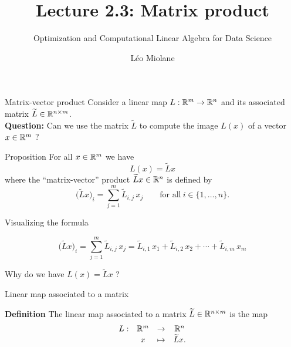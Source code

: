 \documentclass{beamer}
\title{Lecture 2.3: Matrix product}
\subtitle{Optimization and Computational Linear Algebra for Data Science}
\author{Léo Miolane}
\date{}
\begin{document}
\setcounter{showProgressBar}{0}
\setcounter{showSlideNumbers}{0}

\frame{\titlepage}


\setcounter{framenumber}{0}
\setcounter{showSlideNumbers}{1}

\begin{frame}[t]{Matrix-vector product}
	Consider a linear map $L:\mathbb{R}^m \to \mathbb{R}^n$ and its associated matrix $\widetilde{L} \in \mathbb{R}^{n \times m}$.
	\\
	\vspace{0.3cm}
	\textbf{Question:} Can we use the matrix $\widetilde{L}$ to compute the image $L(x)$ of a vector $x\in\mathbb{R}^m$ ?
	\vspace{0.3cm}

	\begin{block}{Proposition}
		For all $x\in\mathbb{R}^m$ we have
		$$
		L(x) = \widetilde{L} x
		$$
		where the ``matrix-vector'' product $\widetilde{L}x \in \mathbb{R}^n$ is defined by
		$$
		\big(\widetilde{L}x\big)_i = \sum_{j=1}^m \widetilde{L}_{i,j} \, x_j \qquad \text{for all} \ i \in \{1, \dots, n\}.
		$$
		\vspace{-0.5cm}
	\end{block}
\end{frame}
\begin{frame}[t]{Visualizing the formula}
	\vspace{-0.9cm}
	\begin{exampleblock}{}
		\vspace{-0.4cm}
		$$
		\big(\widetilde{L}x\big)_i = \sum_{j=1}^m \widetilde{L}_{i,j} \, x_j
		= \widetilde{L}_{i,1} \, x_1 + \widetilde{L}_{i,2} \, x_2 + \cdots + \widetilde{L}_{i,m} \, x_m
		$$
		\vspace{-0.4cm}
	\end{exampleblock}
\end{frame}
\begin{frame}[t]{Why do we have $L(x) = \widetilde{L} x$ ?}
\end{frame}

\begin{frame}[t]{Linear map associated to a matrix}
	\vspace{3.5cm}
	\begin{block}{\bf Definition}
		The linear map associated to a matrix $\widetilde{L} \in \mathbb{R}^{n \times m}$ is the map
		$$
		\begin{array}{cccc}
			L:& \mathbb{R}^m & \to & \mathbb{R}^n \\
			  & x & \mapsto & \widetilde{L}x.
		\end{array}
		$$
		\vspace{-0.5cm}
	\end{block}
\end{frame}
\end{document}
